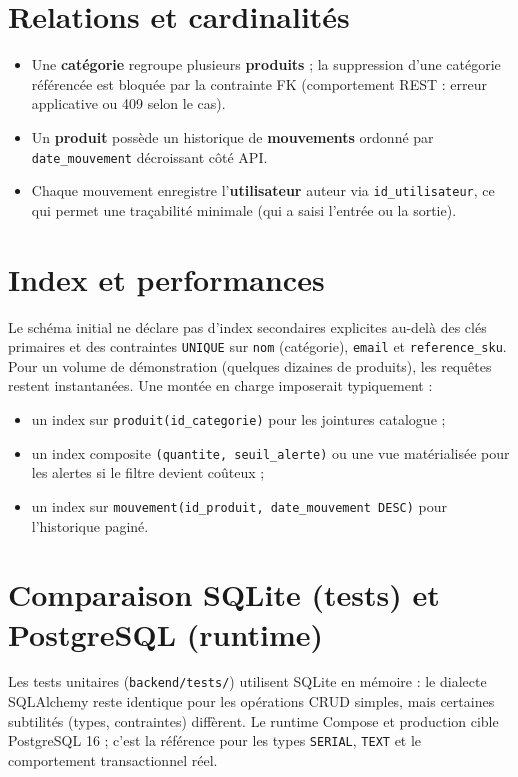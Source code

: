 \section{Relations et cardinalités}

\begin{itemize}
  \item Une \textbf{catégorie} regroupe plusieurs \textbf{produits} ; la suppression d'une catégorie référencée est bloquée par la contrainte FK (comportement REST : erreur applicative ou 409 selon le cas).
  \item Un \textbf{produit} possède un historique de \textbf{mouvements} ordonné par \texttt{date\_mouvement} décroissant côté API.
  \item Chaque mouvement enregistre l'\textbf{utilisateur} auteur via \texttt{id\_utilisateur}, ce qui permet une traçabilité minimale (qui a saisi l'entrée ou la sortie).
\end{itemize}

\section{Index et performances}

Le schéma initial ne déclare pas d'index secondaires explicites au-delà des clés primaires et des contraintes \texttt{UNIQUE} sur \texttt{nom} (catégorie), \texttt{email} et \texttt{reference\_sku}. Pour un volume de démonstration (quelques dizaines de produits), les requêtes restent instantanées. Une montée en charge imposerait typiquement :
\begin{itemize}
  \item un index sur \texttt{produit(id\_categorie)} pour les jointures catalogue ;
  \item un index composite \texttt{(quantite, seuil\_alerte)} ou une vue matérialisée pour les alertes si le filtre devient coûteux ;
  \item un index sur \texttt{mouvement(id\_produit, date\_mouvement DESC)} pour l'historique paginé.
\end{itemize}

\section{Comparaison SQLite (tests) et PostgreSQL (runtime)}

Les tests unitaires (\texttt{backend/tests/}) utilisent SQLite en mémoire : le dialecte SQLAlchemy reste identique pour les opérations CRUD simples, mais certaines subtilités (types, contraintes) diffèrent. Le runtime Compose et production cible PostgreSQL 16 ; c'est la référence pour les types \texttt{SERIAL}, \texttt{TEXT} et le comportement transactionnel réel.


